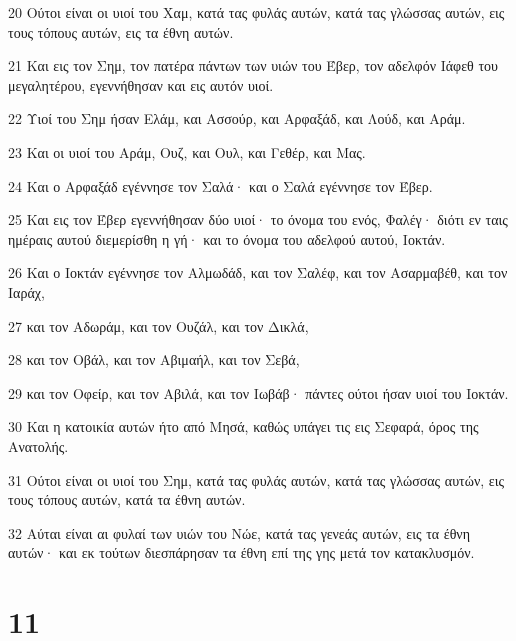 \par 20 Ούτοι είναι οι υιοί του Χαμ, κατά τας φυλάς αυτών, κατά τας γλώσσας αυτών, εις τους τόπους αυτών, εις τα έθνη αυτών.
\par 21 Και εις τον Σημ, τον πατέρα πάντων των υιών του Έβερ, τον αδελφόν Ιάφεθ του μεγαλητέρου, εγεννήθησαν και εις αυτόν υιοί.
\par 22 Υιοί του Σημ ήσαν Ελάμ, και Ασσούρ, και Αρφαξάδ, και Λούδ, και Αράμ.
\par 23 Και οι υιοί του Αράμ, Ουζ, και Ουλ, και Γεθέρ, και Μας.
\par 24 Και ο Αρφαξάδ εγέννησε τον Σαλά· και ο Σαλά εγέννησε τον Έβερ.
\par 25 Και εις τον Έβερ εγεννήθησαν δύο υιοί· το όνομα του ενός, Φαλέγ· διότι εν ταις ημέραις αυτού διεμερίσθη η γή· και το όνομα του αδελφού αυτού, Ιοκτάν.
\par 26 Και ο Ιοκτάν εγέννησε τον Αλμωδάδ, και τον Σαλέφ, και τον Ασαρμαβέθ, και τον Ιαράχ,
\par 27 και τον Αδωράμ, και τον Ουζάλ, και τον Δικλά,
\par 28 και τον Οβάλ, και τον Αβιμαήλ, και τον Σεβά,
\par 29 και τον Οφείρ, και τον Αβιλά, και τον Ιωβάβ· πάντες ούτοι ήσαν υιοί του Ιοκτάν.
\par 30 Και η κατοικία αυτών ήτο από Μησά, καθώς υπάγει τις εις Σεφαρά, όρος της Ανατολής.
\par 31 Ούτοι είναι οι υιοί του Σημ, κατά τας φυλάς αυτών, κατά τας γλώσσας αυτών, εις τους τόπους αυτών, κατά τα έθνη αυτών.
\par 32 Αύται είναι αι φυλαί των υιών του Νώε, κατά τας γενεάς αυτών, εις τα έθνη αυτών· και εκ τούτων διεσπάρησαν τα έθνη επί της γης μετά τον κατακλυσμόν.

\chapter{11}


